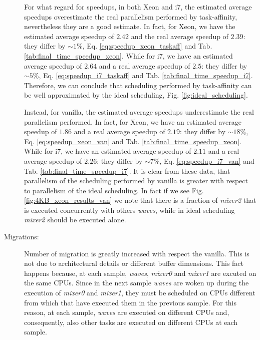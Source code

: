 \begin{description}
For what regard for speedups, in both Xeon and i7, the estimated average speedups overestimate the real parallelism performed by task-affinity, nevertheless
they are a good estimate. In fact, for Xeon, we have the estimated average speedup of $2.42$ and the real average speedup of $2.39$: they 
differ by $\sim 1\%$, Eq. \ref{eq:speedup_xeon_taskaff} and Tab. \ref{tab:final_time_speedup_xeon}. While for i7, we have an estimated average speedup of 
$2.64$ and a real average speedup of $2.5$: they differ by $\sim 5\%$, Eq. \ref{eq:speedup_i7_taskaff} and Tab. \ref{tab:final_time_speedup_i7}. Therefore, 
we can conclude that scheduling performed by task-affinity can be well approximated by the ideal scheduling, Fig. \ref{fig:ideal_scheduling}.

Instead, for vanilla, the estimated average speedups underestimate the real parallelism performed. In fact, for Xeon, we have an estimated average speedup 
of $1.86$ and a real average speedup of $2.19$: they differ by $\sim 18\%$, Eq. \ref{eq:speedup_xeon_van} and Tab. \ref{tab:final_time_speedup_xeon}. While 
for i7, we have an estimated average speedup of $2.11$ and a real average speedup of $2.26$: they differ by $\sim 7\%$, Eq. \ref{eq:speedup_i7_van} and 
Tab. \ref{tab:final_time_speedup_i7}. It is clear from these data, that parallelism of the scheduling performed by vanilla is greater with respect 
to parallelism of the ideal scheduling. In fact if we see Fig. \ref{fig:4KB_xeon_results_van} we note that there is a fraction of \textit{mixer2} that is 
executed concurrently with others \textit{waves}, while in ideal scheduling \textit{mixer2} should be executed alone.

\item[Migrations:] Number of migration is greatly increased with respect the vanilla. This is not due to architectural details or different buffer 
dimensions. This fact happens because, at each sample, \textit{waves}, \textit{mixer0} and \textit{mixer1} are excuted on the same CPUs. Since in the 
next sample \textit{waves} are woken up during the execution of \textit{mixer0} and \textit{mixer1}, they must be scheduled on CPUs different from which 
that have executed them in the previous sample. For this reason, at each sample, \textit{waves} are executed on different CPUs and, consequently, also 
other tasks are executed on different CPUs at each sample.


\end{description}
